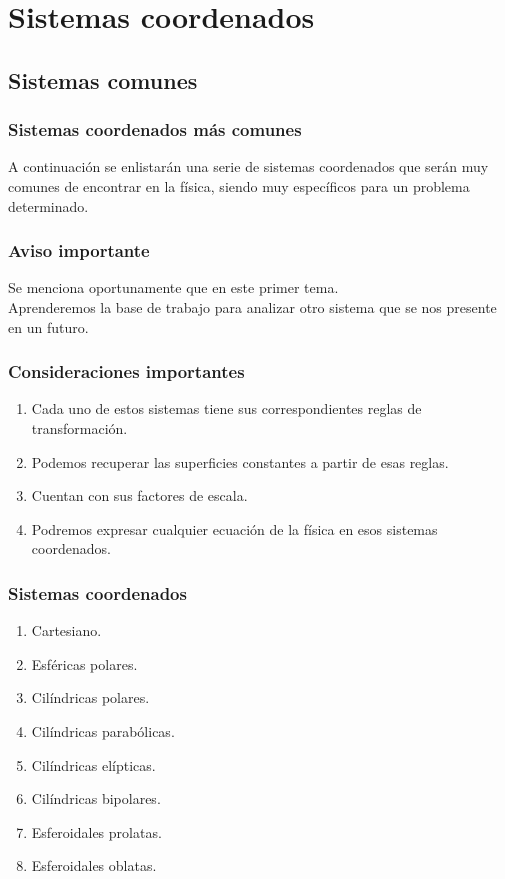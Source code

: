 \documentclass[12pt]{beamer}
\begin{document}
\section{Sistemas coordenados}
\subsection{Sistemas comunes}

\begin{frame}
\frametitle{Sistemas coordenados más comunes}
A continuación se enlistarán una serie de sistemas coordenados que serán muy comunes de encontrar en la física, siendo muy específicos para un problema determinado.
\end{frame}
\begin{frame}
\frametitle{Aviso importante}
Se menciona oportunamente que  en este primer tema.
\\
\bigskip
\pause
Aprenderemos la base de trabajo para analizar otro sistema que se nos presente en un futuro.
\end{frame}
\begin{frame}
\frametitle{Consideraciones importantes}
\begin{enumerate}[<+->]
\item Cada uno de estos sistemas tiene sus correspondientes reglas de transformación.
\item Podemos recuperar las superficies constantes a partir de esas reglas.
\item Cuentan con sus factores de escala.
\item Podremos expresar cualquier ecuación de la física en esos sistemas coordenados.
\end{enumerate}
\end{frame}
\begin{frame}
\frametitle{Sistemas coordenados}
\begin{enumerate}[<+->]
\item Cartesiano.
\item Esféricas polares.
\item Cilíndricas polares.
\item Cilíndricas parabólicas.
\item Cilíndricas elípticas.
\item Cilíndricas bipolares.
\item Esferoidales prolatas.
\item Esferoidales oblatas.
\seti
\end{enumerate}
\end{frame}
\end{document}
